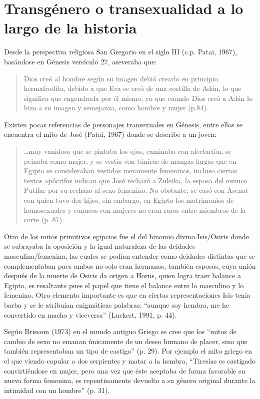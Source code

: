 \section{Transgénero o transexualidad a lo largo de la historia}
Desde la perspectiva religiosa San Gregorio en el siglo III (c.p.
Patai, 1967), basándose en Génesis versículo 27, aseveraba que:

\begin{quote}
    Dios creó al hombre según su imagen debió crearlo en principio hermafrodita,
    debido a que Eva se creó de una costilla de Adán, lo que significa que
    engendrada por él mismo, ya que cuando Dios creó a Adán lo hizo a su imagen y
    semejanza, como hombre y mujer (p.84).
\end{quote}

Existen pocas referencias de personajes transexuales en Génesis, entre ellos
se encuentra el mito de José (Patai, 1967) donde se describe a un joven:

\begin{quote}
    …muy vanidoso que se pintaba los ojos, caminaba con afectación, se peinaba como
    mujer, y se vestía con túnicas de mangas largas que en Egipto se consideraban
    vestidos meramente femeninos, incluso ciertos textos apócrifos indican que José
    rechazó a Zuleika, la esposa del eunuco Putifar por su rechazo al sexo femenino.
    No obstante, se casó con Asenat con quien tuvo dos hijos, sin embargo, en Egipto
    los matrimonios de homosexuales y eunucos con mujeres no eran raros entre
    miembros de la corte (p. 87).
\end{quote}

Otro de los mitos primitivos egipcios fue el del binomio divino Isis/Osiris
donde se subrayaba la oposición y la igual naturaleza de las deidades
masculina/femenina, las cuales se podían entender como deidades distintas que se
complementaban pues ambos no solo eran hermanos, también esposos, cuya unión
después de la muerte de Osiris da origen a Horus, quien logra traer balance a
Egipto, es resaltante pues el papel que tiene el balance entre lo masculino y lo
femenino.
Otro elemento importante es que en ciertas representaciones Isis tenía barba y
se le atribuían enigmáticas palabras: “aunque soy hembra, me he convertido en
macho y viceversa” (Luckert, 1991, p. 44).

Según Brissom (1973) en el mundo antiguo Griego se cree que los “mitos de cambio
de sexo no emanan únicamente de un deseo humano de placer, sino que también
representaban un tipo de castigo” (p. 29).
Por ejemplo el mito griego en el que viendo copular a dos serpientes y matar
a la hembra, “Tiresias es castigado convirtiéndose en mujer, pero una vez que
éste aceptaba de forma favorable su nueva forma femenina, es repentinamente
devuelto a su género original durante la intimidad con un hombre” (p. 31).

